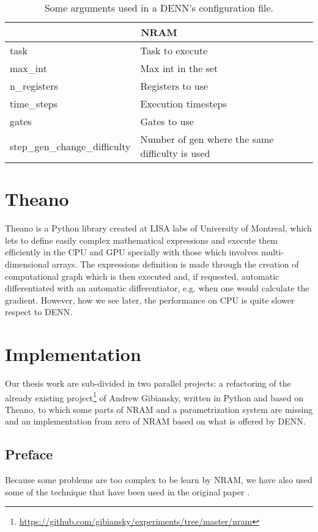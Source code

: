 \begin{table}[]
\begin{tabular}{|l|l|}
\multicolumn{2}{|c|}{\textbf{NRAM}} \\ \hline
task  	 		& Task to execute \\ \hline
max\_int  		& Max int in the set \\ \hline
n\_registers  	& Registers to use \\ \hline
time\_steps  	& Execution timesteps \\ \hline
gates  			& Gates to use \\ \hline
step\_gen\_change\_difficulty & Number of gen where the same difficulty is used  \\ \hline

\end{tabular}
\caption{Some arguments used in a DENN's configuration file.}
\label{tbl:denn-parameters}
\end{table}

\section{Theano}
Theano is a Python library created at LISA labs of University of Montreal, which lets to define easily complex mathematical expressions and execute them efficiently in the CPU and GPU specially with those which involves multi-dimensional arrays. The expressions definition is made through the creation of computational graph which is then executed and, if requested, automatic differentiated with an automatic differentiator, e.g. when one would calculate the gradient. However, how we see later, the performance on CPU is quite slower respect to DENN. %

\section{Implementation}
Our thesis work are sub-divided in two parallel projects: a refactoring of the already existing project\footnote{\hyperref[https://github.com/gibiansky/experiments/tree/master/nram]{https://github.com/gibiansky/experiments/tree/master/nram}} of Andrew Gibiansky, written in Python and based on Theano, to which some parts of NRAM and a parametrization system are missing and an implementation from zero of NRAM based on what is offered by DENN.

\subsection{Preface}
Because some problems are too complex to be learn by NRAM, we have also used some of the technique that have been used in the original paper \cite{NRAM:2016}.

